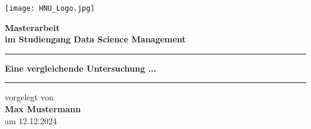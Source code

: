 \documentclass[12pt, a4paper, twoside]{article} %
\newcommand*{\getStudyCourse}{Data Science Management}
\newcommand*{\getThesisType}{Masterarbeit}
\newcommand*{\getTitle}{Eine vergleichende Untersuchung ...}
\newcommand*{\getAuthor}{Max Mustermann}
\newcommand*{\getSubmissionDate}{12.12.2024}
\begin{document}

\begin{titlepage}
    \begin{center}
        \vspace*{\fill} %

        \begin{minipage}{\textwidth}
            \centering

            \texttt{[image: HNU\_Logo.jpg]} 
            \vspace*{1cm}

            \begin{minipage}{0.6\textwidth}
                \centering
                \Large \textbf{\getThesisType} \\
                \vspace{0.5cm}
                \large \textbf{im Studiengang \getStudyCourse} \\
                \vspace{0.5cm}
                \vspace{0.2cm}
                \hrule %
                \vspace{0.2cm}
                \Huge \textbf{\getTitle} \\
                \vspace{0.2cm}
                \hrule %
                \vspace{0.5cm}
                \normalsize vorgelegt von \\
                \textbf{\getAuthor} \\
                am \getSubmissionDate \\
            \end{minipage}

            \vspace*{1cm}


\end{minipage}
\end{center}
\end{titlepage}
\end{document}
